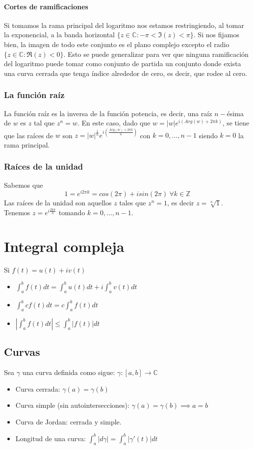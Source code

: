 \documentclass[paper=a4, fontsize=11pt]{scrartcl}
\numberwithin{equation}{section}
\numberwithin{figure}{section}
\numberwithin{table}{section}
\begin{document}
\paragraph{Cortes de ramificaciones}
Si tomamos la rama principal del logaritmo nos estamos restringiendo, al tomar la exponencial, a la banda horizontal $\{z\in\mathbb{C}: -\pi < \Im (z) < \pi\}$. Si nos fijamos bien, la imagen de todo este conjunto es el plano complejo excepto el radio $\{z\in\mathbb{C}: \Re(z)<0\}$. Esto se puede generalizar para ver que ninguna ramificación del logaritmo puede tomar como conjunto de partida un conjunto donde exista una curva cerrada que tenga índice alrededor de cero, es decir, que rodee al cero.

\subsubsection{La función raíz}
La función raíz es la inversa de la función potencia, es decir, una raíz $n-$ésima de $w$ es $z$ tal que $z^n=w$. En este caso, dado que $w=|w|e^{i(Arg(w)+2\pi k)}$, se tiene que las raíces de $w$ son $\boxed{z=|w|^{\frac{1}{n}}e^{i\left(\frac{Arg(w)+2\pi k}{n}\right)}}$ con $k=0,\hdots,n-1$ siendo $k=0$ la rama principal.

\subsubsection{Raíces de la unidad}
Sabemos que $$1=e^{i2\pi k} = cos(2\pi)+isin(2\pi)\ \forall k\in\mathbb{Z}$$
Las raíces de la unidad son aquellos $z$ tales que $z^n = 1$, es decir $z=\sqrt[n]{1}$.
Tenemos $\boxed{z=e^{i\frac{2k\pi}{n}}}$ tomando $\boxed{k=0,\hdots,n-1}$.

\newpage
\section{Integral compleja}
Si $f(t)=u(t)+iv(t)$
\begin{itemize}
\item $\int_a^b f(t)dt = \int_a^b u(t)dt+i\int_a^b v(t)dt$
\item $\int_a^b cf(t)dt = c\int_a^b f(t)dt$
\item $\left|\int_a^b f(t)dt\right| \le \int_a^b \left|f(t)\right|dt$
\end{itemize}

\subsection{Curvas}
Sea $\gamma$ una curva definida como sigue: $\gamma:[a,b]\to\mathbb{C}$
\begin{itemize}
\item Curva cerrada:  $\gamma(a) = \gamma(b)$
\item Curva simple (sin autointersecciones): $\gamma(a)=\gamma(b) \implies a=b$
\item Curva de Jordan: cerrada y simple.
\item Longitud de una curva: $\int_a^b |d\gamma| = \int_a^b |\gamma'(t)|dt$
\end{itemize}
\end{document}
